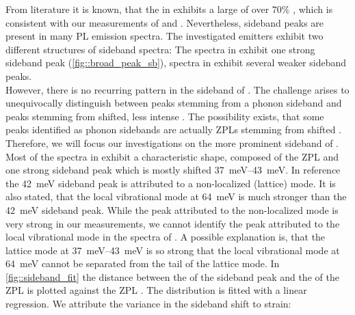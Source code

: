 		From literature it is known, that the \siv in \nd exhibits a large \db of over 70\% \cite{Neu2011,Neu2011b}, which is consistent with our measurements of \emnarrow and \embroad.
		Nevertheless, sideband peaks are present in many \siv PL emission spectra.
		The investigated emitters exhibit two different structures of sideband spectra: The spectra in \gv exhibit one strong sideband peak (\autoref{fig::broad_peak_sb}), spectra in \gh exhibit several weaker sideband peaks.
		\\
		However, there is no recurring pattern in the sideband of \gh.
		The challenge arises to unequivocally distinguish between peaks stemming from a phonon sideband and peaks stemming from shifted, less intense \siv \ZPLs.
		The possibility exists, that some peaks identified as phonon sidebands are actually ZPLs stemming from shifted \sivs. 
		Therefore, we will focus our investigations on the more prominent sideband of \gv.
		\\
		Most of the spectra in \gv exhibit a characteristic shape, composed of the ZPL and one strong sideband peak which is mostly shifted \SIrange{37}{43}{meV}. 
		In reference \cite{Dietrich2014} the \SI{42}{meV} sideband peak is attributed to a non-localized (lattice) mode. 
		It is also stated, that the local vibrational mode at \SI{64}{meV} is much stronger than the  \SI{42}{meV} sideband peak. 
		While the peak attributed to the non-localized mode is very strong in our measurements, we cannot identify the peak attributed to the local vibrational \siv mode in the spectra of \gv. 
		A possible explanation is, that the lattice mode at \SIrange{37}{43}{meV} is so strong that the local vibrational mode at \SI{64}{meV} cannot be separated from the tail of the lattice mode.
		In \autoref{fig::sideband_fit} the distance between the \cwl of the sideband peak and the \cwl of the ZPL is plotted against the ZPL \cwl. 
		The distribution is fitted with a linear regression.
		We attribute the variance in the sideband shift to strain: 
		\\
		\begin{figure}[tp]
			\begin{subfigure}[t]{ 0.49\linewidth}
				\centering
				\caption{}
				\label{subfig::sb_multfit_pos}
			\end{subfigure}
			\hfill
			\begin{subfigure}[t]{ 0.49\linewidth}
				\centering
				\caption{}
				\label{subfig::sb_multfit_width}
			\end{subfigure}
			\caption{}
			\label{fig::sb_multfit}
		\end{figure}
		